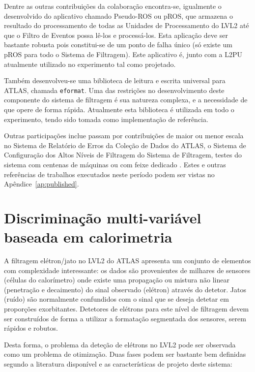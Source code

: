 Dentre as outras contribuições da colaboração encontra-se, igualmente o
desenvolvido do aplicativo chamado Pseudo-ROS ou pROS, que armazena o
resultado do processamento de todas as Unidades de Processamento do LVL2 até
que o Filtro de Eventos possa lê-los e processá-los. Esta aplicação deve ser
bastante robusta pois constitui-se de um ponto de falha único (só existe um
pROS para todo o Sistema de Filtragem). Este aplicativo é, junto com a L2PU
atualmente utilizado no experimento tal como projetado.

Também desenvolveu-se uma biblioteca de leitura e escrita universal para
ATLAS, chamada \texttt{eformat}. Uma das restrições no desenvolvimento deste
componente do sistema de filtragem é sua natureza complexa, e a necessidade de
que opere de forma rápida. Atualmente esta biblioteca é utilizada em todo o
experimento, tendo sido tomada como implementação de referência.

Outras participações inclue passam por contribuições de maior ou menor escala
no Sistema de Relatório de Erros da Coleção de Dados do ATLAS, o Sistema de
Configuração dos Altos Níveis de Filtragem \cite{aa:rt-05, aa:jinst-06} do
Sistema de Filtragem, testes do sistema com centenas de máquinas
\cite{aa:chep-06-01} ou com feixe dedicado \cite{aa:tns-06}. Estes e outras
referências de trabalhos executados neste período podem ser vistas no
Apêndice~\ref{ap:published}.

\section{Discriminação multi-variável baseada em calorimetria}

A filtragem elétron/jato no LVL2 do ATLAS apresenta um conjunto de elementos
com complexidade interessante: os dados são provenientes de milhares de
sensores (células do calorímetro) onde existe uma propagação ou mistura não
linear (penetração e decaimento) do sinal observado (elétron) através do
detetor. Jatos (ruído) são normalmente confundidos com o sinal que se deseja
detetar em proporções exorbitantes. Detetores de elétrons para este nível de
filtragem devem ser construídos de forma a utilizar a formatação segmentada
dos sensores, serem rápidos e robutos.

Desta forma, o problema da deteção de elétrons no LVL2 pode ser observada como
um problema de otimização. Duas fases podem ser bastante bem definidas segundo
a literatura disponível e as características de projeto deste sistema:

